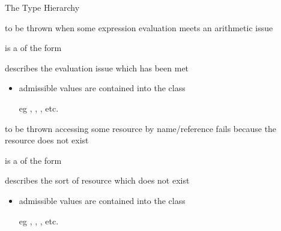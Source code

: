 \documentclass[handout]{beamer}
\begin{document}
\begin{frame}[allowframebreaks]{The  Type Hierarchy}
\begin{description}
        \framebreak

        \item[\kt{EvaluationError}] to be thrown when some expression evaluation meets an arithmetic issue
        \begin{description}\small
            \item[\pl{\textit{Description}}] is a  of the form 
            \item[\pl{\textit{Type}}] describes the evaluation issue which has been met
            \begin{itemize}\scriptsize
                \item admissible values are contained into the class 
                \item[eg] , , , etc.
            \end{itemize}
        \end{description}

        \framebreak

        \item[\kt{ExistenceError}] to be thrown accessing some resource by name/reference fails because the resource does not exist
        \begin{description}\small
            \item[\pl{\textit{Description}}] is a  of the form 
            \item[\pl{\textit{ObjectType}}] describes the sort of resource which does not exist
            \begin{itemize}\scriptsize
                \item admissible values are contained into the class 
                \item[eg] , , , etc.
            \end{itemize}
        \end{description}

        \framebreak


\end{description}
\end{frame}
\end{document}
